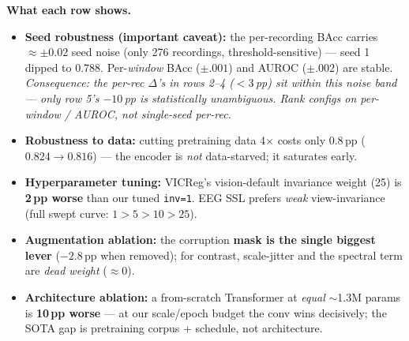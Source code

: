 \documentclass[10pt,a4paper]{article}
\begin{document}
\smallskip
\noindent\textbf{What each row shows.}
\begin{itemize}\itemsep1pt
\item[\textbf{1b}] \textbf{Seed robustness (important caveat):} the per-recording BAcc carries
$\approx\pm0.02$ seed noise (only 276 recordings, threshold-sensitive) --- seed 1 dipped to 0.788.
Per-\emph{window} BAcc ($\pm.001$) and AUROC ($\pm.002$) are stable. \emph{Consequence: the per-rec
$\Delta$'s in rows 2--4 ($<3$\,pp) sit within this noise band --- only row 5's $-10$\,pp is
statistically unambiguous. Rank configs on per-window / AUROC, not single-seed per-rec.}
\item[\textbf{2}] \textbf{Robustness to data:} cutting pretraining data 4$\times$ costs only $0.8$\,pp ($0.824\!\to\!0.816$) --- the encoder is \emph{not} data-starved; it saturates early.
\item[\textbf{3}] \textbf{Hyperparameter tuning:} VICReg's vision-default invariance weight (25) is \textbf{2\,pp worse} than our tuned \texttt{inv=1}. EEG SSL prefers \emph{weak} view-invariance (full swept curve: $1>5>10>25$).
\item[\textbf{4}] \textbf{Augmentation ablation:} the corruption \textbf{mask is the single biggest lever} ($-2.8$\,pp when removed); for contrast, scale-jitter and the spectral term are \emph{dead weight} ($\approx0$).
\item[\textbf{5}] \textbf{Architecture ablation:} a from-scratch Transformer at \emph{equal} $\sim$1.3M params is \textbf{10\,pp worse} --- at our scale/epoch budget the conv wins decisively; the SOTA gap is pretraining corpus + schedule, not architecture.
\end{itemize}
\end{document}
